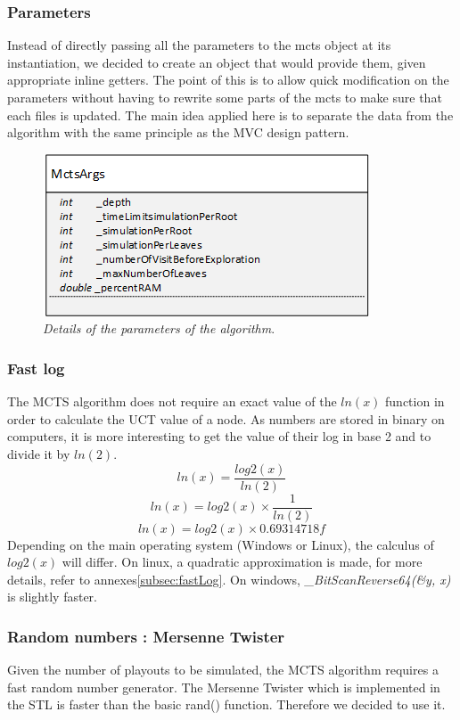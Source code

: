 \subsubsection{Parameters}
Instead of directly passing all the parameters to the mcts object at its instantiation, we decided to create an object that would provide them, given appropriate inline getters. The point of this is to allow quick modification on the parameters without having to rewrite some parts of the mcts to make sure that each files is updated. The main idea applied here is to separate the data from the algorithm with the same principle as the MVC design pattern.
\begin{figure}[H] 
\centerline{\includegraphics[scale=0.8]{Data_Structure/Img/MctsArgs.png}}
\caption{\label{fig:mctsargsuml}\textit{Details of the parameters of the algorithm}.}
\end{figure}

\subsubsection{Fast log}
The MCTS algorithm does not require an exact value of the \ensuremath{ln(x)} function in order to calculate the UCT value of a node. As numbers are stored in binary on computers, it is more interesting to get the value of their log in base 2 and to divide it by \ensuremath{ln(2)}. 
\begin{equation}
ln(x) = \frac{log2(x)}{ln(2)}
\end{equation}
\begin{equation}
ln(x) = log2(x) \times \frac{1}{ln(2)}
\end{equation}
\begin{equation}
ln(x) = log2(x) \times 0.69314718f
\end{equation}
Depending on the main operating system (Windows or Linux), the calculus of \ensuremath{log2(x)} will differ. On linux, a quadratic approximation is made, for more details, refer to annexes\ref{subsec:fastLog}. On windows, \textit{\_BitScanReverse64(\&y, x)} is slightly faster. 

\subsubsection{Random numbers : Mersenne Twister}
Given the number of playouts to be simulated, the MCTS algorithm requires a fast random number generator. The Mersenne Twister which is implemented in the STL is faster than the basic rand() function. Therefore we decided to use it.



